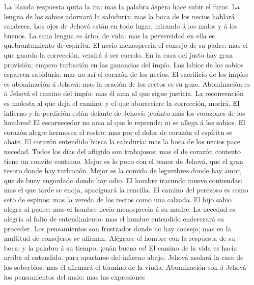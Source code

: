  La blanda respuesta quita la ira: mas la palabra áspera
hace subir el furor.  La lengua de los sabios adornará la
sabiduría: mas la boca de los necios hablará sandeces. 
Los ojos de Jehová están en todo lugar, mirando á los malos y á los
buenos.  La sana lengua es árbol de vida: mas la
perversidad en ella es quebrantamiento de espíritu.  El
necio menosprecia el consejo de su padre: mas el que guarda la
corrección, vendrá á ser cuerdo.  En la casa del justo hay
gran provisión; empero turbación en las ganancias del impío.
 Los labios de los sabios esparcen sabiduría: mas no así
el corazón de los necios.  El sacrificio de los impíos es
abominación á Jehová: mas la oración de los rectos es su gozo.
 Abominación es á Jehová el camino del impío: mas él ama
al que sigue justicia.  La reconvención es molesta al que
deja el camino: y el que aborreciere la corrección, morirá.
 El infierno y la perdición están delante de Jehová:
¡cuánto más los corazones de los hombres!  El
escarnecedor no ama al que le reprende; ni se allega á los sabios.
 El corazón alegre hermosea el rostro: mas por el dolor
de corazón el espíritu se abate.  El corazón entendido
busca la sabiduría: mas la boca de los necios pace necedad.
 Todos los días del afligido son trabajosos: mas el de
corazón contento tiene un convite continuo.  Mejor es lo
poco con el temor de Jehová, que el gran tesoro donde hay turbación.
 Mejor es la comida de legumbres donde hay amor, que de
buey engordado donde hay odio.  El hombre iracundo mueve
contiendas: mas el que tarde se enoja, apaciguará la rencilla.
 El camino del perezoso es como seto de espinos: mas la
vereda de los rectos como una calzada.  El hijo sabio
alegra al padre: mas el hombre necio menosprecia á su madre.
 La necedad es alegría al falto de entendimiento: mas el
hombre entendido enderezará su proceder.  Los
pensamientos son frustrados donde no hay consejo; mas en la multitud de
consejeros se afirman.  Alégrase el hombre con la
respuesta de su boca: y la palabra á su tiempo, ¡cuán buena es!
 El camino de la vida es hacia arriba al entendido, para
apartarse del infierno abajo.  Jehová asolará la casa de
los soberbios: mas él afirmará el término de la viuda. 
Abominación son á Jehová los pensamientos del malo: mas las expresiones
